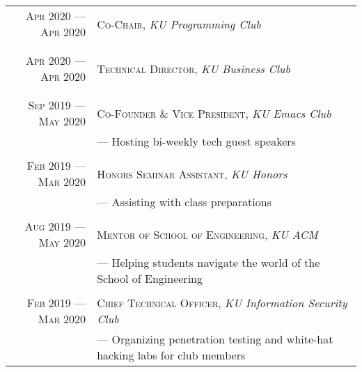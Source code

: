 \documentclass[a4paper, 10pt]{article}
\begin{document}
\begin{tabular}{r|p{11cm}}

	\textsc{Apr 2020 --- Apr 2020} & \textsc{Co-Chair}, \emph{KU Programming Club}                           \\&\footnotesize{
	}                                                                                                        \\\multicolumn{2}{c}{}\\

	\textsc{Apr 2020 --- Apr 2020} & \textsc{Technical Director}, \emph{KU Business Club}                    \\&\footnotesize{
	}                                                                                                        \\\multicolumn{2}{c}{}\\

	\textsc{Sep 2019 --- May 2020} & \textsc{Co-Founder \& Vice President}, \emph{KU Emacs Club}             \\&\footnotesize{
		--- Hosting bi-weekly tech guest speakers
	}                                                                                                        \\\multicolumn{2}{c}{}\\

	\textsc{Feb 2019 --- Mar 2020} & \textsc{Honors Seminar Assistant}, \emph{KU Honors}                     \\&\footnotesize{
		--- Assisting with class preparations
	}                                                                                                        \\\multicolumn{2}{c}{}\\

	\textsc{Aug 2019 --- May 2020} & \textsc{Mentor of School of Engineering}, \emph{KU ACM}                 \\&\footnotesize{
		--- Helping students navigate the world of the School of Engineering

	}                                                                                                        \\\multicolumn{2}{c}{}\\

	\textsc{Feb 2019 --- Mar 2020} & \textsc{Chief Technical Officer}, \emph{KU Information Security Club}   \\&\footnotesize{
		--- Organizing penetration testing and white-hat hacking labs for club members


}
\end{tabular}
\end{document}
